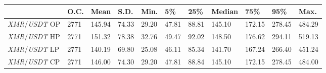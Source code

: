 \begin{tabular}{lllllllllll}
\toprule
 & \textbf{O.C.} & \textbf{Mean} & \textbf{S.D.} & \textbf{Min.} & \textbf{5\%} & \textbf{25\%} & \textbf{Median} & \textbf{75\%} & \textbf{95\%} & \textbf{Max.} \\
\midrule
\emph{XMR}/\emph{USDT} OP & 2771 & 145.94 & 74.33 & 29.20 & 47.81 & 88.81 & 145.10 & 172.15 & 278.45 & 484.29 \\
\emph{XMR}/\emph{USDT} HP & 2771 & 151.32 & 78.38 & 32.76 & 49.47 & 92.02 & 148.50 & 176.62 & 294.11 & 519.13 \\
\emph{XMR}/\emph{USDT} LP & 2771 & 140.19 & 69.80 & 25.08 & 46.11 & 85.34 & 141.70 & 167.24 & 266.40 & 451.24 \\
\emph{XMR}/\emph{USDT} CP & 2771 & 146.00 & 74.30 & 29.20 & 47.81 & 88.84 & 145.10 & 172.15 & 278.45 & 484.00 \\
\bottomrule
\end{tabular}
